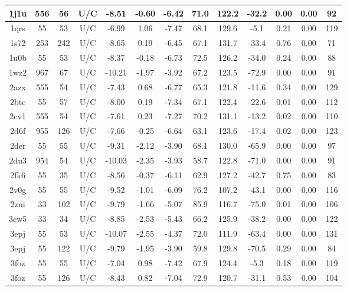 {\begin{center}
\begin{longtable}{|c|c|c|c|c|c|c|c|c|c|c|c|c|}
1j1u & 556 & 56 & U/C & -8.51 & -0.60 & -6.42 & 71.0 & 122.2 & -32.2 & 0.00 & 0.00 & 92 \\ \hline
1qrs & 55 & 53 & U/C & -6.99 & 1.06 & -7.47 & 68.1 & 129.6 & -5.1 & 0.21 & 0.00 & 119 \\ \hline
1s72 & 253 & 242 & U/C & -8.65 & 0.19 & -6.45 & 67.1 & 131.7 & -33.4 & 0.76 & 0.00 & 71 \\ \hline
1u0b & 55 & 53 & U/C & -8.37 & -0.18 & -6.73 & 72.5 & 126.2 & -34.0 & 0.24 & 0.00 & 88 \\ \hline
1wz2 & 967 & 67 & U/C & -10.21 & -1.97 & -3.92 & 67.2 & 123.5 & -72.9 & 0.00 & 0.00 & 91 \\ \hline
2azx & 555 & 54 & U/C & -7.43 & 0.68 & -6.77 & 65.3 & 121.8 & -11.6 & 0.34 & 0.00 & 129 \\ \hline
2bte & 55 & 57 & U/C & -8.00 & 0.19 & -7.34 & 67.1 & 122.4 & -22.6 & 0.01 & 0.00 & 112 \\ \hline
2cv1 & 555 & 54 & U/C & -7.61 & 0.23 & -7.27 & 70.2 & 131.1 & -13.2 & 0.02 & 0.00 & 110 \\ \hline
2d6f & 955 & 126 & U/C & -7.66 & -0.25 & -6.64 & 63.1 & 123.6 & -17.4 & 0.02 & 0.00 & 123 \\ \hline
2der & 55 & 55 & U/C & -9.31 & -2.12 & -3.90 & 68.1 & 130.0 & -65.9 & 0.00 & 0.00 & 97 \\ \hline
2du3 & 954 & 54 & U/C & -10.03 & -2.35 & -3.93 & 58.7 & 122.8 & -71.0 & 0.00 & 0.00 & 91 \\ \hline
2fk6 & 55 & 35 & U/C & -8.56 & -0.37 & -6.11 & 62.9 & 127.2 & -42.7 & 0.75 & 0.00 & 83 \\ \hline
2v0g & 55 & 55 & U/C & -9.52 & -1.01 & -6.09 & 76.2 & 107.2 & -43.1 & 0.00 & 0.00 & 116 \\ \hline
2zni & 33 & 102 & U/C & -9.79 & -1.66 & -5.07 & 85.9 & 116.7 & -75.0 & 0.01 & 0.00 & 106 \\ \hline
3cw5 & 33 & 34 & U/C & -8.85 & -2.53 & -5.43 & 66.2 & 125.9 & -38.2 & 0.00 & 0.00 & 122 \\ \hline
3epj & 55 & 53 & U/C & -10.07 & -2.55 & -4.37 & 72.0 & 111.9 & -63.4 & 0.00 & 0.00 & 131 \\ \hline
3epj & 55 & 122 & U/C & -9.79 & -1.95 & -3.90 & 59.8 & 129.8 & -70.5 & 0.29 & 0.00 & 84 \\ \hline
3foz & 55 & 55 & U/C & -7.04 & 0.98 & -7.42 & 67.9 & 124.4 & -5.3 & 0.18 & 0.00 & 119 \\ \hline
3foz & 55 & 126 & U/C & -8.43 & 0.82 & -7.04 & 72.9 & 120.7 & -31.1 & 0.53 & 0.00 & 104 \\ \hline

\end{longtable}
\end{center}}
